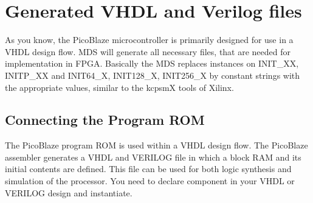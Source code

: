         \section{Generated VHDL and Verilog files}
        As you know, the PicoBlaze microcontroller is primarily designed for use in a VHDL design flow.
        MDS will generate all necessary files, that are needed for
        implementation in FPGA. Basically the MDS replaces instances on
        {INIT\_XX}, {INITP\_XX} and {INIT64\_X}, {INIT128\_X}, {INIT256\_X} by constant strings with the appropriate values, similar to the kcpsmX tools of Xilinx.

                \subsection{Connecting the Program ROM}
                The PicoBlaze program ROM is used within a VHDL design flow. The PicoBlaze assembler
                generates a VHDL and VERILOG file in which a block RAM and its initial contents are defined. This
                file can be used for both logic synthesis and simulation of the processor.
                You need to declare component in your VHDL or VERILOG design and instantiate.\\
